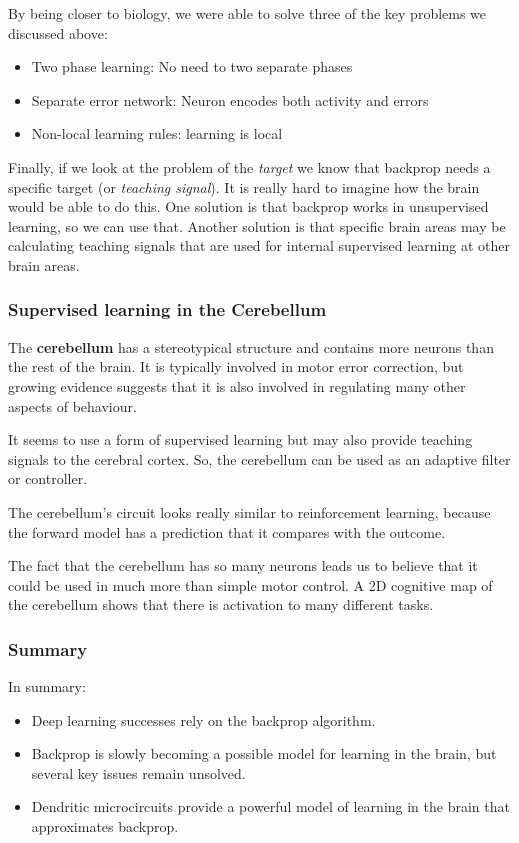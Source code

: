 \documentclass[11pt,a4paper,titlepage,dvipsnames,cmyk]{scrartcl}
\begin{document}
By being closer to biology, we were able to solve three of the key problems we discussed above:
\begin{itemize}
    \item Two phase learning: No need to two separate phases
    \item Separate error network: Neuron encodes both activity and errors
    \item Non-local learning rules: learning is local
\end{itemize}

Finally, if we look at the problem of the \textit{target} we know that backprop needs a specific target (or \textit{teaching signal}). It is really hard to imagine how the brain would be able to do this. One solution is that backprop works in unsupervised learning, so we can use that. Another solution is that specific brain areas may be calculating teaching signals that are used for internal supervised learning at other brain areas.

\subsubsection{Supervised learning in the Cerebellum}
The \textbf{cerebellum} has a stereotypical structure and contains more neurons than the rest of the brain. It is typically involved in motor error correction, but growing evidence suggests that it is also involved in regulating many other aspects of behaviour.

It seems to use a form of supervised learning but may also provide teaching signals to the cerebral cortex. So, the cerebellum can be used as an adaptive filter or controller. 

The cerebellum's circuit looks really similar to reinforcement learning, because the forward model has a prediction that it compares with the outcome.

The fact that the cerebellum has so many neurons leads us to believe that it could be used in much more than simple motor control. A 2D cognitive map of the cerebellum shows that there is activation to many different tasks.

\subsubsection{Summary}
In summary:
\begin{itemize}
    \item Deep learning successes rely on the backprop algorithm.
    \item Backprop is slowly becoming a possible model for learning in the brain, but several key issues remain unsolved.
    \item Dendritic microcircuits provide a powerful model of learning in the brain that approximates backprop.
\end{itemize}
\end{document}
